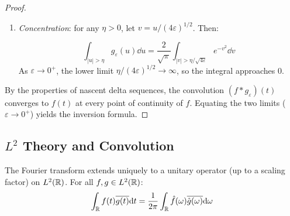 \begin{proof}
\begin{enumerate}
\[
\int_\R g_\varepsilon(u) \dd u = 1
\]

(which follows from evaluating the Gaussian integral or noting it is the inverse Fourier transform of $e^{-\varepsilon \omega^2}$ at $t=0$).
\item \textit{Concentration}: for any $\eta > 0$, let $v = u/(4\varepsilon)^{1/2}$. Then:

\begin{equation}
\int_{|u| > \eta} g_\varepsilon(u) \dd u = \frac{2}{\sqrt{\pi}} \int_{|v| > \eta/\sqrt{4\varepsilon}} e^{-v^2} \dd v
\end{equation}
As $\varepsilon \to 0^+$, the lower limit $\eta/(4\varepsilon)^{1/2} \to \infty$, so the integral approaches 0.
\end{enumerate}
By the properties of nascent delta sequences, the convolution $(f * g_\varepsilon)(t)$ converges to $f(t)$ at every point of continuity of $f$. Equating the two limits ($\varepsilon \to 0^+$) yields the inversion formula.
\end{proof}

\subsection{\texorpdfstring{$L^2$}{L2} Theory and Convolution}

\begin{theorem}
The Fourier transform extends uniquely to a unitary operator (up to a scaling factor) on $L^2(\mathbb{R})$. For all $f, g \in L^2(\mathbb{R})$:
\begin{equation}
\int_{\mathbb{R}} f(t) \overline{g(t)} \mathrm{d} t = \frac{1}{2\pi} \int_{\mathbb{R}} \hat{f}(\omega) \overline{\hat{g}(\omega)} \mathrm{d} \omega
\end{equation}

\end{theorem}

